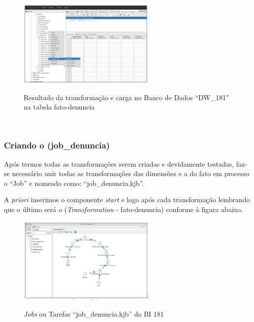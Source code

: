\begin{figure}[H]
	\vspace*{0,2cm}
    \centering
    \caption{Resultado da transforma\c{c}\~{a}o e carga no Banco de Dados ``DW\_181'' na tabela fato-denuncia}
    \includegraphics[width=0.6\textwidth]{./04-figuras/figura-resultado-fato-denuncia}
    \label{fig:ilustfigresultadofatodenuncia}
\end{figure}
\vspace*{-0,9cm}
{\raggedright {}} \\

\subsubsection{Criando o  (job\_denuncia)}

Ap\'os termos todas as transforma\c{c}\~{o}es serem criadas e devidamente testadas, faz-se necess\'{a}rio unir 
todas as transforma\c{c}\~{o}es das dimens\~{o}es e a do fato em processo o ``Job'' e nomeado como: ``job\_denuncia.kjb''. 

A \textit{priori} inserimos o componente \textit{start} e logo ap\'os cada transforma\c{c}\~{a}o lembrando que o último 
ser\'{a} o (\textit{Transformation} - fato-denuncia) conforme \`{a} figura abaixo.

\begin{figure}[H]
	\vspace*{0,2cm}
    \centering
    \caption{\textit{Jobs} ou Tarefas ``job\_denuncia.kjb'' do BI 181}
    \includegraphics[width=0.6\textwidth]{./04-figuras/figura-job}
    \label{fig:ilustfigjob}
\end{figure}
\vspace*{-0,9cm}
{\raggedright {}} \\

